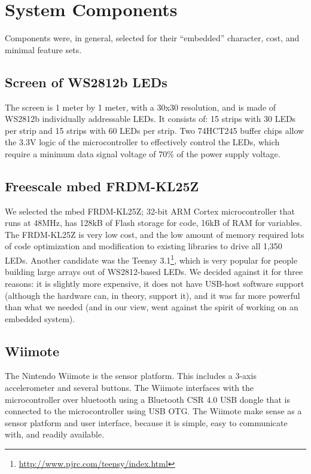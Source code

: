 \documentclass[10pt,twocolumn]{article}
\begin{document}
\section{\textbf{System Components}}
Components were, in general, selected for their ``embedded'' character, cost, and minimal
feature sets.
\subsection{Screen of WS2812b LEDs}
The screen is 1 meter by 1 meter, with a 30x30 resolution, and
is made of WS2812b individually addressable LEDs. It consists of: 15 strips
with 30 LEDs per strip and 15 strips with 60 LEDs per strip. Two 74HCT245
buffer chips allow the 3.3V logic of the microcontroller to effectively
control the LEDs, which require a minimum data signal voltage of 70\% of the
power supply voltage.
\subsection{Freescale mbed FRDM-KL25Z}
We selected the mbed FRDM-KL25Z; 32-bit ARM Cortex microcontroller that runs
at 48MHz, has 128kB of Flash storage for code, 16kB of RAM for variables. The
FRDM-KL25Z is very low cost, and the low amount of memory required lots of
code optimization and modification to existing libraries to drive all 1,350
LEDs. Another candidate was the Teensy
3.1\footnote{\url{http://www.pjrc.com/teensy/index.html}}, which is very
popular for people building large arrays out of WS2812-based LEDs. We decided
against it for three reasons: it is slightly more expensive, it does not have
USB-host software support (although the hardware can, in theory, support it),
and it was far more powerful than what we needed (and in our view, went
against the spirit of working on an embedded system).
\subsection{Wiimote}
The Nintendo Wiimote is the sensor platform. This includes a 3-axis
accelerometer and several buttons. The Wiimote interfaces with the
microcontroller over bluetooth using a Bluetooth CSR 4.0 USB dongle that is
connected to the microcontroller using USB OTG. The Wiimote make sense as a
sensor platform and user interface, because it is simple, easy to communicate
with, and readily available.
\end{document}
